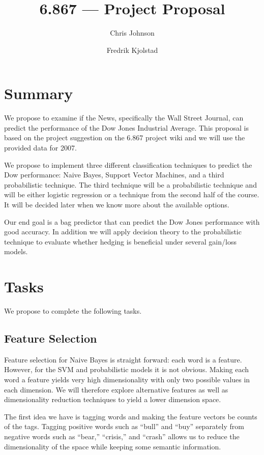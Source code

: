 \documentclass[10pt]{article}
\begin{document}
\title{6.867 --- Project Proposal}
\author{Chris Johnson \and Fredrik Kjolstad}
\date{}
\maketitle

\section{Summary}
We propose to examine if the News, specifically the Wall Street Journal, can predict the performance of the Dow Jones Industrial Average.
This proposal is based on the project suggestion on the 6.867 project wiki and we will use the provided data for 2007.

We propose to implement three different classification techniques to predict the Dow performance: Naive Bayes, Support Vector Machines, and a third probabilistic technique. The third technique will be a probabilistic technique and will be either logistic regression or a technique from the second half of the course.
It will be decided later when we know more about the available options.

Our end goal is a bag predictor that can predict the Dow Jones performance with good accuracy.
In addition we will apply decision theory to the probabilistic technique to evaluate whether hedging is beneficial under several gain/loss models.

\section{Tasks}
We propose to complete the following tasks.
\subsection{Feature Selection}
Feature selection for Naive Bayes is straight forward: each word is a feature.
However, for the SVM and probabilistic models it is not obvious.
Making each word a feature yields very high dimensionality with only two possible values in each dimension.
We will therefore explore alternative features as well as dimensionality reduction techniques to yield a lower dimension space.

The first idea we have is tagging words and making the feature vectors be counts of the tags. 
Tagging positive words such as ``bull'' and ``buy'' separately from negative words such as ``bear,'' ``crisis,'' and ``crash'' allows us to reduce the dimensionality of the space while keeping some semantic information.
\end{document}
